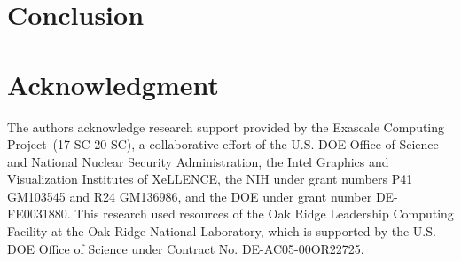 \vspace{-2mm}
\section{Conclusion}
\label{sec:conclusion}

%
\vspace{-1mm}
\section*{Acknowledgment}
The authors acknowledge research support provided by the Exascale Computing Project~(17-SC-20-SC), a collaborative effort of the U.S. DOE Office of Science and National Nuclear Security Administration, the Intel Graphics and Visualization Institutes of XeLLENCE, the NIH under grant numbers P41 GM103545 and R24 GM136986, and the DOE under grant number DE-FE0031880.
%
This research used resources of the Oak Ridge Leadership Computing Facility at the Oak Ridge National Laboratory, which is supported by the U.S. DOE Office of Science under Contract No. DE-AC05-00OR22725.
%

